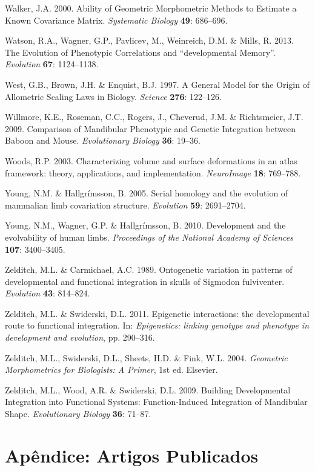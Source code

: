 \documentclass[12pt,twoside]{report}
\begin{document}
Walker, J.A. 2000. Ability of Geometric Morphometric Methods to Estimate
a Known Covariance Matrix. \emph{Systematic Biology} \textbf{49}:
686--696.

Watson, R.A., Wagner, G.P., Pavlicev, M., Weinreich, D.M. \& Mills, R.
2013. The Evolution of Phenotypic Correlations and ``developmental
Memory''. \emph{Evolution} \textbf{67}: 1124--1138.

West, G.B., Brown, J.H. \& Enquist, B.J. 1997. A General Model for the
Origin of Allometric Scaling Laws in Biology. \emph{Science}
\textbf{276}: 122--126.

Willmore, K.E., Roseman, C.C., Rogers, J., Cheverud, J.M. \&
Richtsmeier, J.T. 2009. Comparison of Mandibular Phenotypic and Genetic
Integration between Baboon and Mouse. \emph{Evolutionary Biology}
\textbf{36}: 19--36.

Woods, R.P. 2003. Characterizing volume and surface deformations in an
atlas framework: theory, applications, and implementation.
\emph{NeuroImage} \textbf{18}: 769--788.

Young, N.M. \& Hallgrímsson, B. 2005. Serial homology and the evolution
of mammalian limb covariation structure. \emph{Evolution} \textbf{59}:
2691--2704.

Young, N.M., Wagner, G.P. \& Hallgrímsson, B. 2010. Development and the
evolvability of human limbs. \emph{Proceedings of the National Academy
of Sciences} \textbf{107}: 3400--3405.

Zelditch, M.L. \& Carmichael, A.C. 1989. Ontogenetic variation in
patterns of developmental and functional integration in skulls of
Sigmodon fulviventer. \emph{Evolution} \textbf{43}: 814--824.

Zelditch, M.L. \& Swiderski, D.L. 2011. Epigenetic interactions: the
developmental route to functional integration. In: \emph{Epigenetics:
linking genotype and phenotype in development and evolution}, pp.
290--316.

Zelditch, M.L., Swiderski, D.L., Sheets, H.D. \& Fink, W.L. 2004.
\emph{Geometric Morphometrics for Biologists: A Primer}, 1st ed.
Elsevier.

Zelditch, M.L., Wood, A.R. \& Swiderski, D.L. 2009. Building
Developmental Integration into Functional Systems: Function-Induced
Integration of Mandibular Shape. \emph{Evolutionary Biology}
\textbf{36}: 71--87.

\chapter*{Apêndice: Artigos Publicados}
\end{document}
